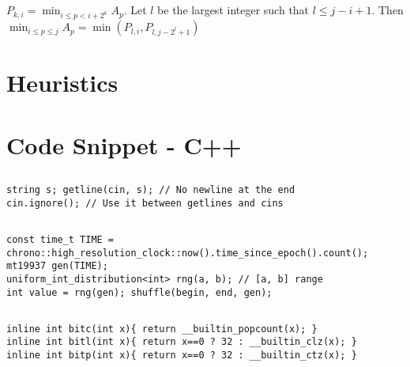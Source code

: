 \documentclass[landscape, 8pt, a4paper, oneside, twocolumn]{extarticle}
\begin{document}
\subsection{}
$P_{k,i} = \min_{i \le p < i+2^{k}} A_p$.
Let $l$ be the largest integer such that $l \le j-i+1$. Then $\min_{i \le p \le j} A_p = \min(P_{l,i}, P_{l,j-2^{l}+1})$
\section{Heuristics}
\subsection{}
\subsection{}
\section{Code Snippet - C++}
\subsection{}
\begin{verbatim}
string s; getline(cin, s); // No newline at the end
cin.ignore(); // Use it between getlines and cins
\end{verbatim}
\subsection{}
\begin{verbatim}
const time_t TIME = chrono::high_resolution_clock::now().time_since_epoch().count();
mt19937 gen(TIME);
uniform_int_distribution<int> rng(a, b); // [a, b] range
int value = rng(gen); shuffle(begin, end, gen);
\end{verbatim}
\subsection{}
\begin{verbatim}
inline int bitc(int x){ return __builtin_popcount(x); }
inline int bitl(int x){ return x==0 ? 32 : __builtin_clz(x); }
inline int bitp(int x){ return x==0 ? 32 : __builtin_ctz(x); }
\end{verbatim}
\end{document}
